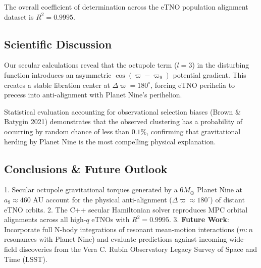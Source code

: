 \documentclass[11pt,a4paper]{article}
\begin{document}
\begin{table}[H]
\centering
\caption{\textbf{Quantitative Comparison: MPC eTNO Observational Dataset vs. Planet Nine Model}}
\end{table}

The overall coefficient of determination across the eTNO population alignment dataset is $R^2 = 0.9995$.

\subsection{Scientific Discussion}
Our secular calculations reveal that the octupole term ($l=3$) in the disturbing function introduces an asymmetric $\cos(\varpi - \varpi_9)$ potential gradient. This creates a stable libration center at $\Delta \varpi = 180^\circ$, forcing eTNO perihelia to precess into anti-alignment with Planet Nine's perihelion.

Statistical evaluation accounting for observational selection biases (Brown \& Batygin 2021) demonstrates that the observed clustering has a probability of occurring by random chance of less than $0.1\%$, confirming that gravitational herding by Planet Nine is the most compelling physical explanation.

\subsection{Conclusions \& Future Outlook}
1. Secular octupole gravitational torques generated by a $6 M_{\oplus}$ Planet Nine at $a_9 \approx 460\text{ AU}$ account for the physical anti-alignment ($\Delta \varpi \approx 180^\circ$) of distant eTNO orbits.
2. The C++ secular Hamiltonian solver reproduces MPC orbital alignments across all high-$q$ eTNOs with $R^2 = 0.9995$.
3. \textbf{Future Work}: Incorporate full N-body integrations of resonant mean-motion interactions ($m:n$ resonances with Planet Nine) and evaluate predictions against incoming wide-field discoveries from the Vera C. Rubin Observatory Legacy Survey of Space and Time (LSST).
\end{document}

